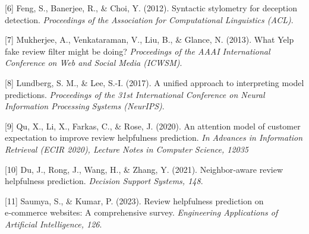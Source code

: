 {[}6{]} Feng, S., Banerjee, R., \& Choi, Y. (2012). Syntactic stylometry
for deception detection. \emph{Proceedings of the Association for
Computational Linguistics (ACL)}.

{[}7{]} Mukherjee, A., Venkataraman, V., Liu, B., \& Glance, N. (2013).
What Yelp fake review filter might be doing? \emph{Proceedings of the
AAAI International Conference on Web and Social Media (ICWSM)}.

{[}8{]} Lundberg, S. M., \& Lee, S.-I. (2017). A unified approach to
interpreting model predictions. \emph{Proceedings of the 31st
International Conference on Neural Information Processing Systems
(NeurIPS)}.

{[}9{]} Qu, X., Li, X., Farkas, C., \& Rose, J. (2020). An attention
model of customer expectation to improve review helpfulness prediction.
\emph{In Advances in Information Retrieval (ECIR 2020), Lecture Notes in
Computer Science, 12035}

{[}10{]} Du, J., Rong, J., Wang, H., \& Zhang, Y. (2021). Neighbor‑aware
review helpfulness prediction. \emph{Decision Support Systems, 148}.

{[}11{]} Saumya, S., \& Kumar, P. (2023). Review helpfulness prediction
on e‑commerce websites: A comprehensive survey. \emph{Engineering
Applications of Artificial Intelligence, 126}.
